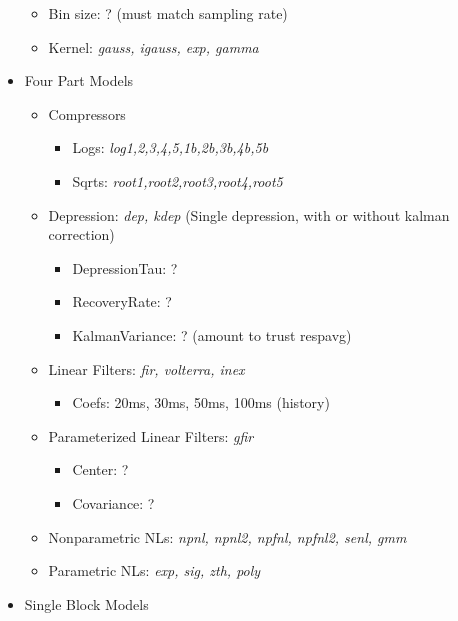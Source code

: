 \documentclass[11pt]{article}
\begin{document}
\begin{itemize}
\begin{itemize}
\item Bin size: ? (must match sampling rate)
\item Kernel: \emph{gauss, igauss, exp, gamma}
\end{itemize}

\item Four Part Models

\begin{itemize}
\item Compressors

\begin{itemize}
\item Logs: \emph{log1,2,3,4,5,1b,2b,3b,4b,5b}
\item Sqrts: \emph{root1,root2,root3,root4,root5}
\end{itemize}

\item Depression: \emph{dep, kdep}     (Single depression, with or without kalman correction)

\begin{itemize}
\item DepressionTau: ?
\item RecoveryRate: ?
\item KalmanVariance: ? (amount to trust respavg)
\end{itemize}

\item Linear Filters: \emph{fir, volterra, inex}

\begin{itemize}
\item Coefs: 20ms, 30ms, 50ms, 100ms (history)
\end{itemize}

\item Parameterized Linear Filters: \emph{gfir}

\begin{itemize}
\item Center: ?
\item Covariance: ?
\end{itemize}

\item Nonparametric NLs: \emph{npnl, npnl2, npfnl, npfnl2, senl, gmm}
\item Parametric NLs: \emph{exp, sig, zth, poly}
\end{itemize}

\item Single Block Models


\end{itemize}
\end{document}
